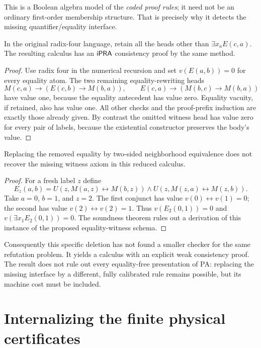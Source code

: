 This is a Boolean algebra model of the \emph{coded proof rules}; it need
not be an ordinary first-order membership structure. That is precisely
why it detects the missing quantifier/equality interface.

\begin{proposition}
In the original radix-four language, retain all the heads other than
$\exists x_a E(c,a)$. The resulting calculus has an $\mathsf{iPRA}$ consistency
proof by the same method.
\end{proposition}
\begin{proof}
Use radix four in the numerical recursion and set $v(E(a,b))=0$ for every
equality atom. The two remaining equality-rewriting heads
\[
 M(c,a)\to(E(c,b)\to M(b,a)),\qquad
 E(c,a)\to(M(b,c)\to M(b,a))
\]
have value one, because the equality antecedent has value zero.
Equality vacuity, if retained, also has value one. All other checks and
the proof-prefix induction are exactly those already given.
By contrast the omitted witness head has value zero for every pair of
labels, because the existential constructor preserves the body's value.
\end{proof}

\begin{proposition}
Replacing the removed equality by two-sided neighborhood equivalence
does not recover the missing witness axiom in this reduced calculus.
\end{proposition}
\begin{proof}
For a fresh label $z$ define
\[
 E_z(a,b)=U(z,M(a,z)\leftrightarrow M(b,z))
       \wedge U(z,M(z,a)\leftrightarrow M(z,b)).
\]
Take $a=0$, $b=1$, and $z=2$. The first conjunct has value
$v(0)\leftrightarrow v(1)=0$; the second has value
$v(2)\leftrightarrow v(2)=1$. Thus $v(E_2(0,1))=0$ and
$v(\exists x_1 E_2(0,1))=0$. The soundness theorem rules out a derivation
of this instance of the proposed equality-witness schema.
\end{proof}

Consequently this specific deletion has not found a smaller checker for
the same refutation problem. It yields a calculus with an explicit weak
consistency proof. The result does not rule out every equality-free
presentation of PA: replacing the missing interface by a different, fully
calibrated rule remains possible, but its machine cost must be included.

\section{Internalizing the finite physical certificates}

